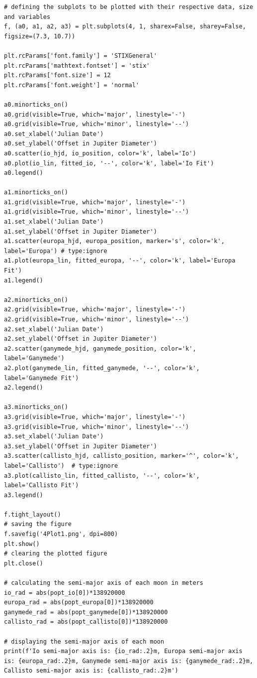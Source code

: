 \documentclass[12pt, a4paper]{article}
\begin{document}
\begin{verbatim}
# defining the subplots to be plotted with their respective data, size and variables
f, (a0, a1, a2, a3) = plt.subplots(4, 1, sharex=False, sharey=False, figsize=(7.3, 10.7))

plt.rcParams['font.family'] = 'STIXGeneral'
plt.rcParams['mathtext.fontset'] = 'stix'
plt.rcParams['font.size'] = 12
plt.rcParams['font.weight'] = 'normal'

a0.minorticks_on()
a0.grid(visible=True, which='major', linestyle='-')
a0.grid(visible=True, which='minor', linestyle='--')
a0.set_xlabel('Julian Date')
a0.set_ylabel('Offset in Jupiter Diameter')
a0.scatter(io_hjd, io_position, color='k', label='Io')
a0.plot(io_lin, fitted_io, '--', color='k', label='Io Fit')
a0.legend()

a1.minorticks_on()
a1.grid(visible=True, which='major', linestyle='-')
a1.grid(visible=True, which='minor', linestyle='--')
a1.set_xlabel('Julian Date')
a1.set_ylabel('Offset in Jupiter Diameter')
a1.scatter(europa_hjd, europa_position, marker='s', color='k', label='Europa') # type:ignore
a1.plot(europa_lin, fitted_europa, '--', color='k', label='Europa Fit')
a1.legend()

a2.minorticks_on()
a2.grid(visible=True, which='major', linestyle='-')
a2.grid(visible=True, which='minor', linestyle='--')
a2.set_xlabel('Julian Date')
a2.set_ylabel('Offset in Jupiter Diameter')
a2.scatter(ganymede_hjd, ganymede_position, color='k', label='Ganymede')
a2.plot(ganymede_lin, fitted_ganymede, '--', color='k', label='Ganymede Fit')
a2.legend()

a3.minorticks_on()
a3.grid(visible=True, which='major', linestyle='-')
a3.grid(visible=True, which='minor', linestyle='--')
a3.set_xlabel('Julian Date')
a3.set_ylabel('Offset in Jupiter Diameter')
a3.scatter(callisto_hjd, callisto_position, marker='^', color='k', label='Callisto')  # type:ignore
a3.plot(callisto_lin, fitted_callisto, '--', color='k', label='Callisto Fit')
a3.legend()

f.tight_layout()
# saving the figure
f.savefig('4Plot1.png', dpi=800)
plt.show()
# clearing the plotted figure
plt.close()

# calculating the semi-major axis of each moon in meters
io_rad = abs(popt_io[0])*138920000
europa_rad = abs(popt_europa[0])*138920000
ganymede_rad = abs(popt_ganymede[0])*138920000
callisto_rad = abs(popt_callisto[0])*138920000

# displaying the semi-major axis of each moon
print(f'Io semi-major axis is: {io_rad:.2}m, Europa semi-major axis is: {europa_rad:.2}m, Ganymede semi-major axis is: {ganymede_rad:.2}m, Callisto semi-major axis is: {callisto_rad:.2}m')


\end{verbatim}
\end{document}
